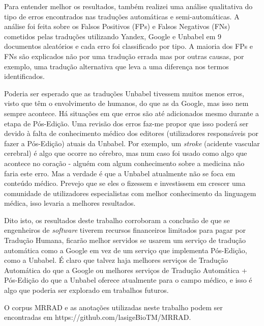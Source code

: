 \begin{abstractspt}
Para entender melhor os resultados, também realizei uma análise qualitativa do tipo de erros encontrados nas traduções automáticas e semi-automáticas. A análise foi feita sobre os Falsos Positivos (FPs) e Falsos Negativos (FNs) cometidos pelas traduções utilizando Yandex, Google e Unbabel em 9 documentos aleatórios e cada erro foi classificado por tipo. A maioria dos FPs e FNs são explicados não por uma tradução errada mas por outras causas, por exemplo, uma tradução alternativa que leva a uma diferença nos termos identificados. 

Poderia ser esperado que as traduções Unbabel tivessem muitos menos erros, visto que têm o envolvimento de humanos, do que as da Google, mas isso nem sempre acontece. Há situações em que erros são até adicionados mesmo durante a etapa de Pós-Edição. Uma revisão dos erros faz-me propor que isso poderá ser devido à falta de conhecimento médico dos editores (utilizadores responsáveis por fazer a Pós-Edição) atuais da Unbabel. Por exemplo, um \textit{stroke} (acidente vascular cerebral) é algo que ocorre no cérebro, mas num caso foi usado como algo que acontece no coração - alguém com algum conhecimento sobre a medicina não faria este erro. Mas a verdade é que a Unbabel atualmente não se foca em conteúdo médico. Prevejo que se eles o fizessem e investissem em crescer uma comunidade de utilizadores especialistas com melhor conhecimento da linguagem médica, isso levaria a melhores resultados.

Dito isto, os resultados deste trabalho corroboram a conclusão de que se engenheiros de \textit{software} tiverem recursos financeiros limitados para pagar por Tradução Humana, ficarão melhor servidos se usarem um serviço de tradução automática como a Google em vez de um serviço que implementa Pós-Edição, como a Unbabel. É claro que talvez haja melhores serviços de Tradução Automática do que a Google ou melhores serviços de Tradução Automática + Pós-Edição do que a Unbabel oferece atualmente para o campo médico, e isso é algo que poderia ser explorado em trabalhos futuros.

O corpus MRRAD e as anotações utilizadas neste trabalho podem ser encontradas em https://github.com/lasigeBioTM/MRRAD.

\end{abstractspt}

